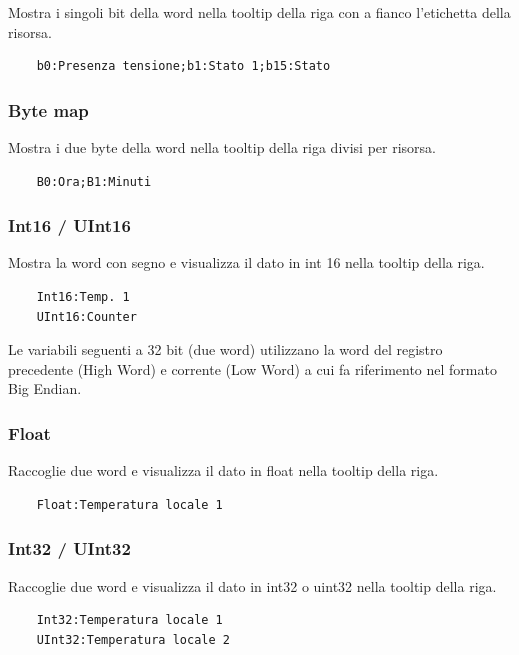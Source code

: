 Mostra i singoli bit della word nella tooltip della riga con a fianco l'etichetta della risorsa.

\begin{verbatim}
    b0:Presenza tensione;b1:Stato 1;b15:Stato
\end{verbatim}

\subsubsection{Byte map}

Mostra i due byte della word nella tooltip della riga divisi per risorsa.

\begin{verbatim}
    B0:Ora;B1:Minuti
\end{verbatim}

\subsubsection{Int16 / UInt16}

Mostra la word con segno e visualizza il dato in int 16 nella tooltip della riga.

\begin{verbatim}
    Int16:Temp. 1
    UInt16:Counter
\end{verbatim}

Le variabili seguenti a 32 bit (due word) utilizzano la word del registro precedente (High Word) e
corrente (Low Word) a cui fa riferimento nel formato Big Endian.

\subsubsection{Float}

Raccoglie due word e visualizza il dato in float nella tooltip della riga.

\begin{verbatim}
    Float:Temperatura locale 1
\end{verbatim}

\subsubsection{Int32 / UInt32}

Raccoglie due word e visualizza il dato in int32 o uint32 nella tooltip della riga.

\begin{verbatim}
    Int32:Temperatura locale 1
    UInt32:Temperatura locale 2
\end{verbatim}


